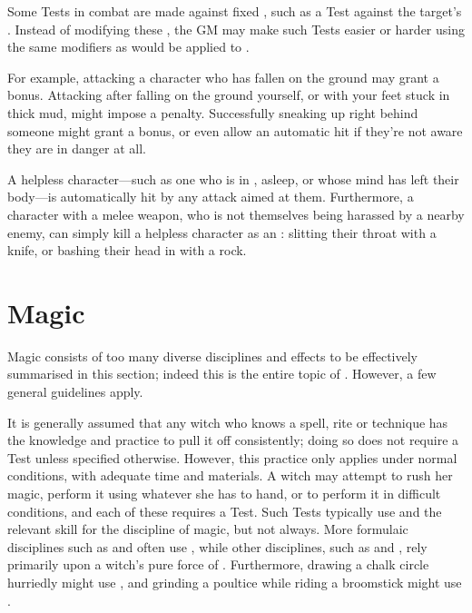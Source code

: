 Some Tests in combat are made against fixed {\tns}, such as a  Test against the target's .
Instead of modifying these {\tns}, the GM may make such Tests easier or harder using the same modifiers as would be applied to {\opposedtests}.

For example, attacking a character who has fallen on the ground may grant a  bonus.
Attacking after falling on the ground yourself, or with your feet stuck in thick mud, might impose a  penalty.
Successfully sneaking up right behind someone might grant a  bonus, or even allow an automatic hit if they're not aware they are in danger at all.

A helpless character---such as one who is in {\shock}, asleep, or whose mind has left their body---is automatically hit by any attack aimed at them.
Furthermore, a character with a melee weapon, who is not themselves being harassed by a nearby enemy, can simply kill a helpless character as an {\action}: slitting their throat with a knife, or bashing their head in with a rock.

\section{Magic}

Magic consists of too many diverse disciplines and effects to be effectively summarised in this section; indeed this is the entire topic of .
However, a few general guidelines apply.

It is generally assumed that any witch who knows a spell, rite or technique has the knowledge and practice to pull it off consistently; doing so does not require a Test unless specified otherwise.
However, this practice only applies under normal conditions, with adequate time and materials.
A witch may attempt to rush her magic, perform it using whatever she has to hand, or to perform it in difficult conditions, and each of these requires a Test.
Such Tests typically use  and the relevant skill for the discipline of magic, but not always.
More formulaic disciplines such as  and  often use , while other disciplines, such as  and , rely primarily upon a witch's pure force of .
Furthermore, drawing a chalk circle hurriedly might use , and grinding a poultice while riding a broomstick might use .

